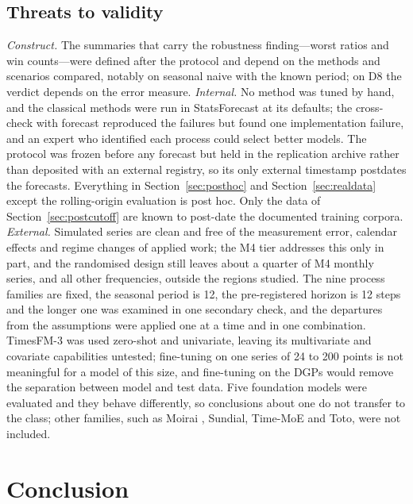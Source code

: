 \documentclass[ASNA]{USG}
\newcommand{\pkg}[1]{\textsf{#1}}
\providecommand{\sectionref}[1]{Section~\ref{#1}}
\begin{document}
\subsection{Threats to validity}
\label{sec:limitations}

\emph{Construct.} The summaries that carry the robustness finding---worst ratios and win counts---were
defined after the protocol and depend on the methods and scenarios compared, notably on seasonal naive with the
known period; on D8 the verdict depends on the error measure. \emph{Internal.} No method was tuned by hand,
and the classical methods were run in \pkg{StatsForecast} at its defaults; the cross-check with \pkg{forecast}
reproduced the failures but found one implementation failure, and an expert who identified each process
could select better models. The protocol was frozen before any forecast but held in the replication archive
rather than deposited with an external registry, so its only external timestamp postdates the forecasts.
Everything in \sectionref{sec:posthoc} and \sectionref{sec:realdata} except the rolling-origin evaluation is
post hoc. Only the data of \sectionref{sec:postcutoff} are known to post-date the documented training
corpora. \emph{External.} Simulated
series are clean and free of the measurement error, calendar effects and regime changes of applied work; the
M4 tier addresses this only in part, and the randomised design still leaves about a quarter of M4 monthly
series, and all other frequencies, outside the regions studied. The nine process families are fixed, the
seasonal period is 12, the pre-registered horizon is 12 steps and the longer one was examined in one
secondary check, and the departures from the assumptions were applied one at a time and in one combination. TimesFM-3 was used
zero-shot and univariate, leaving its multivariate and covariate capabilities untested; fine-tuning on one
series of 24 to 200 points is not meaningful for a model of this size, and fine-tuning on the DGPs would remove
the separation between model and test data. Five foundation models were evaluated and they behave
differently, so conclusions about one do not transfer to the class; other families, such as Moirai
\citep{woo2024moirai, liu2025moirai2}, Sundial, Time-MoE and Toto, were not included.

\section{Conclusion}
\label{sec:conclusion}
\end{document}
